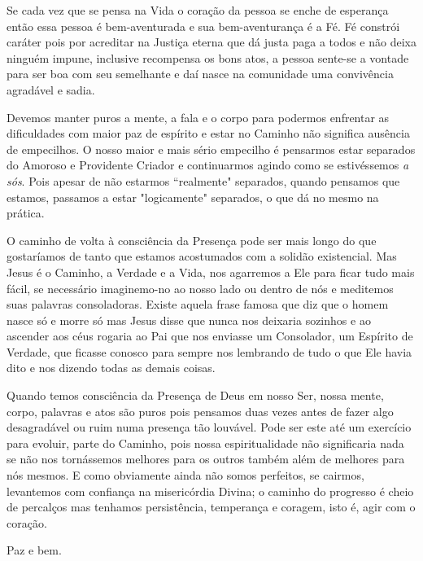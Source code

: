 \emdash{}Se cada vez que se pensa na Vida o coração da pessoa se enche de esperança então essa pessoa é bem-aventurada e sua bem-aventurança é a Fé. Fé constrói caráter pois por acreditar na Justiça eterna que dá justa paga a todos e não deixa ninguém impune, inclusive recompensa os bons atos, a pessoa sente-se a vontade para ser boa com seu semelhante e daí nasce na comunidade uma convivência agradável e sadia.

\emdash{}Devemos manter puros a mente, a fala e o corpo para podermos enfrentar as dificuldades com maior paz de espírito e estar no Caminho não significa ausência de empecilhos. O nosso maior e mais sério empecilho é pensarmos estar separados do Amoroso e Providente Criador e continuarmos agindo como se estivéssemos \textit{a sós}. Pois apesar de não estarmos ``realmente" separados, quando pensamos que estamos, passamos a estar "logicamente" separados, o que dá no mesmo na prática.

\emdash{}O caminho de volta à consciência da Presença pode ser mais longo do que gostaríamos de tanto que estamos acostumados com a solidão existencial. Mas Jesus é o Caminho, a Verdade e a Vida, nos agarremos a Ele para ficar tudo mais fácil, se necessário imaginemo-no ao nosso lado ou dentro de nós e meditemos suas palavras consoladoras. Existe aquela frase famosa que diz que o homem nasce só e morre só mas Jesus disse que nunca nos deixaria sozinhos e ao ascender aos céus rogaria ao Pai que nos enviasse um Consolador, um Espírito de Verdade, que ficasse conosco para sempre nos lembrando de tudo o que Ele havia dito e nos dizendo todas as demais coisas.

\emdash{}Quando temos consciência da Presença de Deus em nosso Ser, nossa mente, corpo, palavras e atos são puros pois pensamos duas vezes antes de fazer algo desagradável ou ruim numa presença tão louvável. Pode ser este até um exercício para evoluir, parte do Caminho, pois nossa espiritualidade não significaria nada se não nos tornássemos melhores para os outros também além de melhores para nós mesmos. E como obviamente ainda não somos perfeitos, se cairmos, levantemos com confiança na misericórdia Divina; o caminho do progresso é cheio de percalços mas tenhamos persistência, temperança e coragem, isto é, agir com o coração.

\emdash{}Paz e bem.
